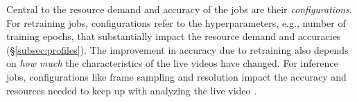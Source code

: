 
Central to the resource demand and accuracy of the jobs %
are their {\em configurations}. For retraining jobs, configurations refer to the hyperparameters, e.g., number of training epochs, that substantially impact the resource demand and accuracies (\S\ref{subsec:profiles}). The improvement in accuracy due to retraining also depends on {\em how much} the characteristics of the live videos have changed. For inference jobs, configurations like frame sampling and resolution impact the accuracy and resources needed to keep up with analyzing the live video \cite{chameleon, noscope}. 


